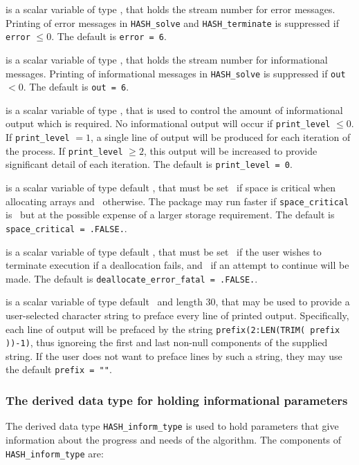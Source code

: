 \documentclass{galahad}
\newcommand{\packagename}{HASH}
\begin{document}
\begin{description}

 is a scalar variable of type \integer, that holds the
stream number for error messages. Printing of error messages in
{\tt \packagename\_solve} and {\tt \packagename\_terminate}
is suppressed if {\tt error} $\leq 0$.
The default is {\tt error = 6}.

 is a scalar variable of type \integer, that holds the
stream number for informational messages. Printing of informational messages in
{\tt \packagename\_solve} is suppressed if {\tt out} $< 0$.
The default is {\tt out = 6}.

 is a scalar variable of type \integer, that is used
to control the amount of informational output which is required. No
informational output will occur if {\tt print\_level} $\leq 0$. If
{\tt print\_level} $= 1$, a single line of output will be produced for each
iteration of the process. If {\tt print\_level} $\geq 2$, this output will be
increased to provide significant detail of each iteration.
The default is {\tt print\_level = 0}.

 is a scalar variable of type default \logical,
that must be set \true\ if space is critical when allocating arrays
and  \false\ otherwise. The package may run faster if
{\tt space\_critical} is \false\ but at the possible expense of a larger
storage requirement. The default is {\tt space\_critical = .FALSE.}.

 is a scalar variable of type default \logical,
that must be set \true\ if the user wishes to terminate execution if
a deallocation  fails, and \false\ if an attempt to continue
will be made. The default is {\tt deallocate\_error\_fatal = .FALSE.}.

 is a scalar variable of type default \character\
and length 30, that may be used to provide a user-selected
character string to preface every line of printed output.
Specifically, each line of output will be prefaced by the string
{\tt prefix(2:LEN(TRIM( prefix ))-1)},
thus ignoreing the first and last non-null components of the
supplied string. If the user does not want to preface lines by such
a string, they may use the default {\tt prefix = ""}.

\end{description}


\subsubsection{The derived data type for holding informational
 parameters}\label{typeinform}
The derived data type
{\tt \packagename\_inform\_type}
is used to hold parameters that give information about the progress and needs
of the algorithm. The components of
{\tt \packagename\_inform\_type}
are:
\end{document}
